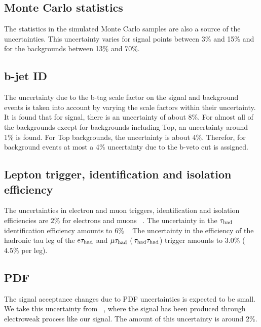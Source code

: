 

\subsection{Monte Carlo  statistics} 
The statistics in the simulated Monte Carlo samples are also a
  source of the  uncertainties. %
This uncertainty varies for signal points between 3\% and 15\% and for the backgrounds between 13\% and 70\%.

\subsection{b-jet ID}
The uncertainty due to the b-tag scale factor on the signal and background events is taken into account by varying the scale factors within their 
uncertainty. It is found that for signal, there is an uncertainty of about $8\%$. For almost all of the backgrounds except for backgrounds including Top, an uncertainty around 1\% is found. For Top backgrounds, the uncertainty is about 4\%. Therefor, for background events at most a 4\% uncertainty due to the b-veto cut is assigned. 
 
\subsection{Lepton trigger, identification and isolation efficiency}
The uncertainties in electron and muon triggers, identification and isolation efficiencies are $2\%$ for electrons and muons ~\cite{CMS_AN_2013-171}. The uncertainty in the $\tau_{\rm had}$ identification efficiency amounts to $6\%$ ~\cite{CMS_AN_2013-171}
The uncertainty in the efficiency of the hadronic tau leg of the $e\tau_{\rm had}$ and $\mu\tau_{\rm had}$ ($\,\tau_{\rm had}\tau_{\rm had}$) trigger amounts to $3.0\%$ ($4.5\%$ per leg).

\subsection{PDF}
The signal acceptance changes due to PDF uncertainties is expected to be small. We take this uncertainty from ~\cite{CMS_AN_2012-248}, where the signal has been produced through electroweak process like our signal. The amount of this uncertainty is around $2\%$.

